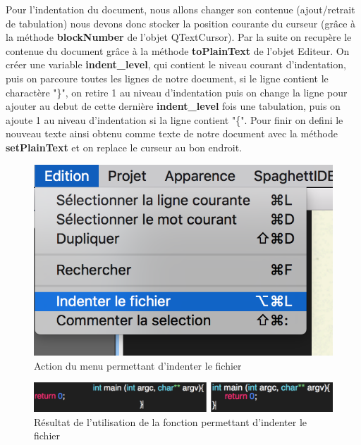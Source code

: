 \documentclass[a4paper,12pt]{article}
\begin{document}
	Pour l'indentation du document, nous allons changer son contenue (ajout/retrait de tabulation) nous devons donc stocker la position courante du curseur (grâce à la méthode \textbf{blockNumber} de l'objet QTextCursor). Par la suite on recupère le contenue du document grâce à la méthode \textbf{toPlainText} de l'objet Editeur. On créer une variable \textbf{indent\_level}, qui contient le niveau courant d'indentation, puis on parcoure toutes les lignes de notre document, si le ligne contient le charactère "\}", on retire 1 au niveau d'indentation puis on change la ligne pour ajouter au debut de cette dernière \textbf{indent\_level} fois une tabulation, puis on ajoute 1 au niveau d'indentation si la ligne contient "\{".
	Pour finir on defini le nouveau texte ainsi obtenu comme texte de notre document avec la méthode \textbf{setPlainText} et on replace le curseur au bon endroit.

	\newpage{}

	\begin{figure}[h!]

		\begin{center}
			\includegraphics[scale=0.8]{imgs/utilisation_indentation}
			\caption{Action du menu permettant d'indenter le fichier}
		\end{center}
	\end{figure}

	\begin{figure}[h!]
		\begin{center}
			\includegraphics[scale=0.8]{imgs/resultat_indentation}
			\caption{Résultat de l'utilisation de la fonction permettant d'indenter le fichier}
		\end{center}
	\end{figure}
\end{document}
